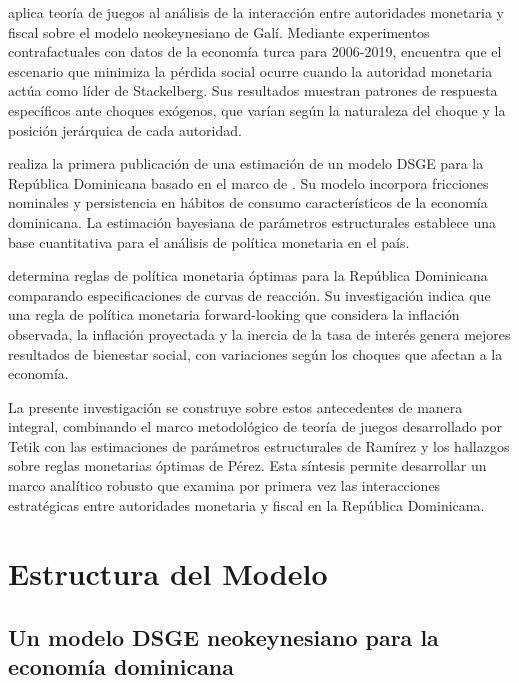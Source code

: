 \documentclass[
  authoryear,
  preprint]{elsarticle}
\begin{document}
\citep{tetik_evaluation_2021} aplica teoría de juegos al análisis de la
interacción entre autoridades monetaria y fiscal sobre el modelo
neokeynesiano de Galí. Mediante experimentos contrafactuales con datos
de la economía turca para 2006-2019, encuentra que el escenario que
minimiza la pérdida social ocurre cuando la autoridad monetaria actúa
como líder de Stackelberg. Sus resultados muestran patrones de respuesta
específicos ante choques exógenos, que varían según la naturaleza del
choque y la posición jerárquica de cada autoridad.

\citep{ramirez_modelo_2014} realiza la primera publicación de una
estimación de un modelo DSGE para la República Dominicana basado en el
marco de \citep{gali_monetary_2005}. Su modelo incorpora fricciones
nominales y persistencia en hábitos de consumo característicos de la
economía dominicana. La estimación bayesiana de parámetros estructurales
establece una base cuantitativa para el análisis de política monetaria
en el país.

\citep{perez_perez_nueva_2021} determina reglas de política monetaria
óptimas para la República Dominicana comparando especificaciones de
curvas de reacción. Su investigación indica que una regla de política
monetaria forward-looking que considera la inflación observada, la
inflación proyectada y la inercia de la tasa de interés genera mejores
resultados de bienestar social, con variaciones según los choques que
afectan a la economía.

La presente investigación se construye sobre estos antecedentes de
manera integral, combinando el marco metodológico de teoría de juegos
desarrollado por Tetik con las estimaciones de parámetros estructurales
de Ramírez y los hallazgos sobre reglas monetarias óptimas de Pérez.
Esta síntesis permite desarrollar un marco analítico robusto que examina
por primera vez las interacciones estratégicas entre autoridades
monetaria y fiscal en la República Dominicana.

\section{Estructura del Modelo}\label{estructura-del-modelo}

\subsection{Un modelo DSGE neokeynesiano para la economía
dominicana}\label{un-modelo-dsge-neokeynesiano-para-la-economuxeda-dominicana}
\end{document}
